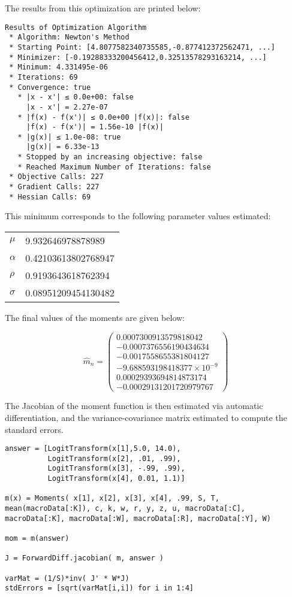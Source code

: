 \documentclass[12pt]{paper}
\newcommand{\est}[2][n]{ \widehat{ #2 }_{#1}}
\begin{document}
The results from this optimization are printed below:
\begin{verbatim}
Results of Optimization Algorithm
 * Algorithm: Newton's Method
 * Starting Point: [4.8077582340735585,-0.877412372562471, ...]
 * Minimizer: [-0.19288333200456412,0.32513578293163214, ...]
 * Minimum: 4.331495e-06
 * Iterations: 69
 * Convergence: true
   * |x - x'| ≤ 0.0e+00: false 
     |x - x'| = 2.27e-07 
   * |f(x) - f(x')| ≤ 0.0e+00 |f(x)|: false
     |f(x) - f(x')| = 1.56e-10 |f(x)|
   * |g(x)| ≤ 1.0e-08: true 
     |g(x)| = 6.33e-13 
   * Stopped by an increasing objective: false
   * Reached Maximum Number of Iterations: false
 * Objective Calls: 227
 * Gradient Calls: 227
 * Hessian Calls: 69
\end{verbatim}

This minimum corresponds to the following parameter values estimated:

\begin{centering}
\begin{tabular}{ll}
  $\mu$ & 9.932646978878989\\
  $\alpha$ & 0.42103613802768947\\
  $\rho$ & 0.9193643618762394 \\
  $\sigma$ & 0.08951209454130482\\
\end{tabular}
  
\end{centering}

The final values of the moments are given below:

\begin{equation*}
 \est{m} = \begin{pmatrix}
  0.0007300913579818042\\
 -0.0007376556190434634\\
 -0.0017558655381804127\\
 -9.688593198418377 \times 10^{-9}\\
  0.00029393694814873174\\
  -0.00029131201720979767
\end{pmatrix}  
\end{equation*}

The Jacobian of the moment function is then estimated via automatic
differentiation, and the variance-covariance matrix estimated to
compute the standard errors.

\begin{verbatim}
answer = [LogitTransform(x[1],5.0, 14.0),
          LogitTransform(x[2], .01, .99),
          LogitTransform(x[3], -.99, .99),
          LogitTransform(x[4], 0.01, 1.1)]

m(x) = Moments( x[1], x[2], x[3], x[4], .99, S, T,  mean(macroData[:K]), c, k, w, r, y, z, u, macroData[:C], macroData[:K], macroData[:W], macroData[:R], macroData[:Y], W)

mom = m(answer)

J = ForwardDiff.jacobian( m, answer )

varMat = (1/S)*inv( J' * W*J)
stdErrors = [sqrt(varMat[i,i]) for i in 1:4]
\end{verbatim}
\end{document}
